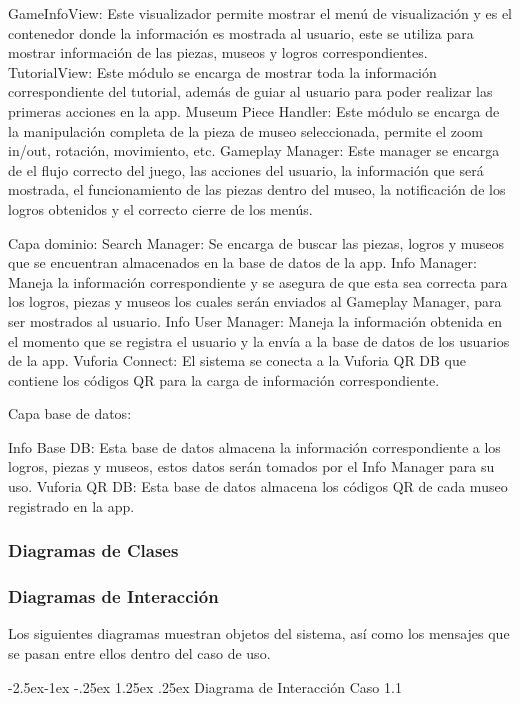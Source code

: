 \documentclass[12pt]{article}
\makeatletter
\renewcommand\paragraph{\@startsection{paragraph}{4}{\z@}%
	{-2.5ex\@plus -1ex \@minus -.25ex}%
	{1.25ex \@plus .25ex}%
	{\normalfont\normalsize\bfseries}}
\makeatother
\begin{document}
GameInfoView: Este visualizador permite mostrar el menú de visualización y es el contenedor donde la información es mostrada al usuario, este se utiliza para mostrar información de las piezas, museos y logros correspondientes.
TutorialView: Este módulo se encarga de mostrar toda la información correspondiente del tutorial, además de guiar al usuario para poder realizar las primeras acciones en la app.
Museum Piece Handler: Este módulo se encarga de la manipulación completa de la pieza de museo seleccionada, permite el zoom in/out, rotación, movimiento, etc.
Gameplay Manager:  Este manager se encarga de el flujo correcto del juego, las acciones del usuario, la información que será mostrada, el funcionamiento de las piezas dentro del museo, la notificación de los logros obtenidos y el correcto cierre de los menús.

Capa dominio:
Search Manager: Se encarga de buscar las piezas, logros y museos que se encuentran almacenados en la base de datos de la app.
Info Manager: Maneja la información correspondiente y se asegura de que esta sea correcta para  los logros, piezas y museos los cuales serán enviados al Gameplay Manager, para ser mostrados al usuario.
Info User Manager: Maneja la información obtenida en el momento que se registra el usuario y la envía a la base de datos de los usuarios de la app.
Vuforia Connect: El sistema se conecta a la Vuforia QR DB que contiene los códigos QR para la carga de información correspondiente.

Capa base de datos:

Info Base DB: Esta base de datos almacena la información correspondiente a los logros, piezas y museos, estos datos serán tomados por el Info Manager para su uso.
Vuforia QR DB: Esta base de datos almacena los códigos QR de cada museo registrado en la app. 


\subsubsection{Diagramas de Clases}
\subsubsection{Diagramas de Interacción}

Los siguientes diagramas muestran objetos del sistema, así como los mensajes que se pasan entre ellos dentro del caso de uso.


\paragraph{Diagrama de Interacción Caso 1.1}
\end{document}
